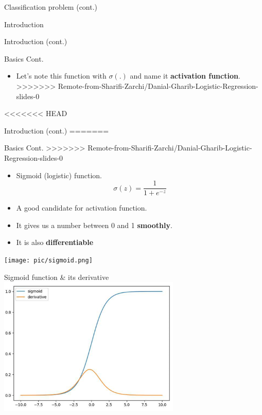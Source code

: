 \documentclass[serif, aspectratio=169]{beamer}
\begin{document}
\begin{frame}{Classification problem (cont.)}
\begin{itemize}
\begin{frame}{Introduction}
\begin{itemize}
\begin{frame}{Introduction (cont.)}
\begin{frame}{Basics Cont.}
\begin{itemize}
        \item Let's note this function with $\sigma (.)$ and name it \textbf{activation function}.
>>>>>>> Remote-from-Sharifi-Zarchi/Danial-Gharib-Logistic-Regression-slides-0
        
    \end{itemize}
\end{frame}

<<<<<<< HEAD
\begin{frame}{Introduction (cont.)}
=======
\begin{frame}{Basics Cont.}
>>>>>>> Remote-from-Sharifi-Zarchi/Danial-Gharib-Logistic-Regression-slides-0
    \begin{minipage}{0.55\textwidth}
    \begin{itemize}
        \item Sigmoid (logistic) function.
        \[
            \sigma (z) = \frac{1}{1 + e^{-z}}
        \]
        \item A good candidate for activation function.
        
        \item It gives us a number between 0 and 1 \textbf{smoothly}.
        \item It is also \textbf{differentiable}

    \end{itemize}
    \end{minipage}%
    \begin{minipage}{0.4\textwidth}
        \centering
        \texttt{[image: pic/sigmoid.png]}
    \end{minipage}
\end{frame}
\begin{frame}{Sigmoid function \& its derivative}
    \centering
        \includegraphics[width=0.65\textwidth]{pic/sigmoidDer.png}
\end{frame}


\end{frame}
\end{frame}
\end{itemize}
\end{frame}
\end{itemize}
\end{frame}
\end{document}
